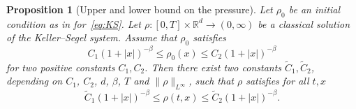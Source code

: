 \documentclass[11pt,a4paper]{article}
\numberwithin{equation}{section}
\newcommand{\R}{{\mathbb{R}}}
\theoremstyle{plain}
\newtheorem{proposition}[theorem]{Proposition}
\theoremstyle{remark}
\newcommand {\f}{\frac}
\newcommand{\diff}{\mathop{}\!\mathrm{d}}
\begin{document}
%
%
%
%
%
%
%
%
%
%
%
%
\begin{proposition}[Upper and lower bound on the pressure]\label{prop:upper_lower_bound_pressure}
Let $\rho_{0}$ be an initial condition as in  %
for~\eqref{eq:KS}.  Let $\rho:[0,T]\times\R^d\to(0,\infty)$ be a classical
solution of the Keller--Segel system. Assume that $\rho_0$ satisfies 
$$
C_1(1+|x|)^{-\beta}\le \rho_0(x)\le C_2
(1+|x|)^{-\beta}
$$
for two positive constants $C_1,C_2$. Then there exist two constants $\tilde C_1,\tilde C_2$, depending on $C_1$, $C_2$, $d$, $\beta$, $T$ and $\|\rho\|_{L^\infty}$, such that $\rho$ satisfies for all $t,x$
$$
\tilde C_1(1+|x|)^{-\beta}\le \rho(t,x)\le \tilde C_2(1+|x|)^{-\beta}.
$$
\end{proposition}
\end{document}
